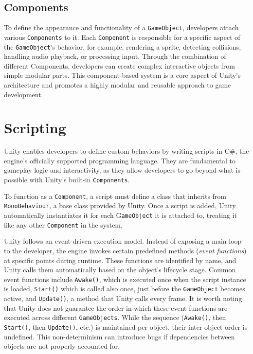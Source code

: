 \subsection{Components}
To define the appearance and functionality of a \verb|GameObject|, developers attach various \verb|Components| to it. Each \verb|Component| is responsible for a specific aspect of the \verb|GameObject|’s behavior, for example, rendering a sprite, detecting collisions, handling audio playback, or processing input. Through the combination of different Components, developers can create complex interactive objects from simple modular parts. This component-based system is a core aspect of Unity’s architecture and promotes a highly modular and reusable approach to game development. 

\section{Scripting}
Unity enables developers to define custom behaviors by writing scripts in C\#, the engine’s officially supported programming language. They are fundamental to gameplay logic and interactivity, as they allow developers to go beyond what is possible with Unity’s built-in \verb|Components|.

To function as a \verb|Component|, a script must define a class that inherits from \verb|MonoBehaviour|, a base class provided by Unity. Once a script is added, Unity automatically instantiates it for each G\verb|ameObject| it is attached to, treating it like any other \verb|Component| in the system.

Unity follows an event-driven execution model. Instead of exposing a main loop to the developer, the engine invokes certain predefined methods (\textit{event functions}) at specific points during runtime. These functions are identified by name, and Unity calls them automatically based on the object’s lifecycle stage. Common event functions include \verb|Awake()|, which is executed once when the script instance is loaded, \verb|Start()| which is called also once, just before the \verb|GameObject| becomes active, and \verb|Update()|, a method that Unity calls every frame. It is worth noting that Unity does not guarantee the order in which these event functions are executed across different \verb|GameObjects|. While the sequence (\verb|Awake()|, then \verb|Start()|, then \verb|Update()|, etc.) is maintained per object, their inter-object order is undefined. This non-determinism can introduce bugs if dependencies between objects are not properly accounted for.


